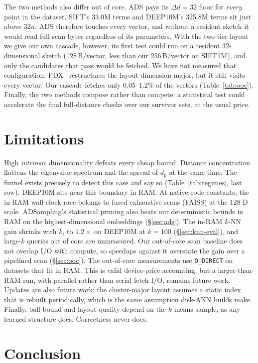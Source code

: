 \documentclass[sigconf, nonacm]{acmart}
\begin{document}
The two methods also differ out of core. ADS pays its $\Delta d = 32$
floor for \emph{every} point in the dataset. SIFT's 33.0M terms and
DEEP10M's 325.8M terms sit just above $32n$. ADS therefore touches every
vector, and without a resident sketch it would read full-scan bytes
regardless of its parameters. With the two-tier layout we give our own
cascade, however, its first test could run on a resident 32-dimensional
sketch (128\,B/vector, less than our 256\,B/vector on SIFT1M), and only
the candidates that pass would be fetched. We have not measured that
configuration. PDX~\cite{pdx} restructures the layout dimension-major,
but it still visits every vector. Our cascade fetches only 0.05--1.2\% of
the vectors (Table~\ref{tab:ooc}). Finally, the two methods compose rather
than compete: a statistical test could accelerate the final full-distance
checks over our survivor sets, at the usual price.

\section{Limitations}

High \emph{intrinsic} dimensionality defeats every cheap bound. Distance
concentration flattens the eigenvalue spectrum and the spread of $d_p$ at
the same time. The funnel exists precisely to detect this case and say so
(Table~\ref{tab:regimes}, last row). DEEP10M sits near this boundary in
RAM. At native-code constants, the in-RAM wall-clock race belongs to
fused exhaustive scans (FAISS) at the 128-D scale. ADSampling's
statistical pruning also beats our deterministic bounds in RAM on the
highest-dimensional embeddings (\S\ref{sec:ads}). The in-RAM $k$-NN
gain shrinks with $k$, to $1.2\times$ on DEEP10M at $k=100$
(\S\ref{sec:knn-eval}), and large-$k$ queries out of core are
unmeasured.
Our out-of-core scan baseline does not overlap I/O with compute, so
speedups against it overstate the gain over a pipelined scan
(\S\ref{sec:ooc}). The out-of-core measurements use
\texttt{O\_DIRECT} on datasets that fit in RAM. This is valid
device-price accounting, but a larger-than-RAM run, with parallel rather
than serial fetch I/O, remains future work. Updates are also future work:
the cluster-major layout assumes a static index that is rebuilt
periodically, which is the same assumption disk-ANN builds make. Finally,
ball-bound and layout quality depend on the $k$-means sample, as any
learned structure does. Correctness never does.

\section{Conclusion}
\end{document}
